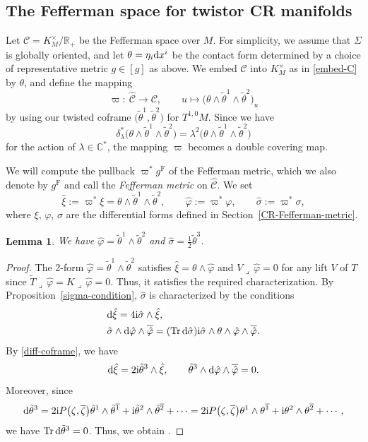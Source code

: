 \documentclass[pdftex]{sigma}
\renewcommand\a{\alpha}
\renewcommand\b{\beta}
\renewcommand\d{\delta}
\renewcommand\th{\theta}
\newcommand\ol{\overline}
\newcommand{\wh}{\widehat}
\numberwithin{equation}{section}
\newtheorem{Lemma}[Theorem]{Lemma}
\begin{document}
\subsection{The Fefferman space for twistor CR manifolds}
Let $\mathcal{C}=K_M^\times/\mathbb{R}_+$ be the Fefferman space over $M$. For simplicity, we assume that $\Sigma$ is globally oriented, and let $\th=\eta_i{\rm d}x^i$ be the contact form determined by a choice of representative metric $g\in[g]$ as above.
We embed $\mathcal{C}$ into $K^\times_M$ as in \eqref{embed-C} by $\th$, and define the mapping
\[
\varpi\colon \ \wh{\mathcal{C}}\longrightarrow \mathcal{C}, \qquad u\longmapsto \bigl(\theta\wedge\tilde\theta^1\wedge\tilde\theta^2\bigr)_u
\]
by using our twisted coframe $\bigl(\tilde\th^1, \tilde\th^2\bigr)$ for $T^{1, 0}M$. %
Since we have
\[
\d_\lambda^*\bigl(\theta\wedge\tilde\theta^1\wedge\tilde\theta^2\bigr)
=\lambda^2\bigl(\theta\wedge\tilde\theta^1\wedge\tilde\theta^2\bigr)
\]
for the action of $\lambda\in\mathbb{C}^*$, the mapping $\varpi$ becomes a double covering map.

We will compute the pullback $\varpi^*g^{\mathrm{F}}$ of the Fefferman metric, which we also denote by $g^{\mathrm{F}}$ and call the {\it Fefferman metric} on $\wh{\mathcal{C}}$. We set
\[
\hat{\xi}:=\varpi^*\xi=\theta\wedge\tilde\theta^1\wedge\tilde\theta^2,\qquad \hat{\varphi}:=\varpi^*\varphi, \qquad \hat{\sigma}:=\varpi^*\sigma,
\]
where $\xi$, $\varphi$, $\sigma$ are the differential forms defined in Section~\ref{CR-Fefferman-metric}.
\begin{Lemma}
We have $\hat\varphi=\tilde\theta^1\wedge\tilde\theta^2$ and $\hat\sigma=\frac{1}{2}\tilde\th^3$.
\end{Lemma}
\begin{proof}
The 2-form $\hat\varphi=\tilde\theta^1\wedge\tilde\theta^2$ satisfies
$\hat\xi=\th\wedge\hat\varphi$ and $V\lrcorner\,\hat\varphi=0$ for any lift $V$ of $T$ since $\tilde T\lrcorner\,\hat\varphi= K\lrcorner\,\hat\varphi=0$. Thus, it satisfies the required characterization. By Proposition~\ref{sigma-condition}, $\hat\sigma$ is characterized by the conditions
\begin{align*}
&{\rm d}\hat\xi=4{\rm i}\hat\sigma\wedge\hat\xi, \\
&\hat\sigma\wedge {\rm d}\hat\varphi\wedge\ol{\hat\varphi}=(\operatorname{Tr} {\rm d}\hat\sigma){\rm i}\hat\sigma\wedge\th\wedge\hat\varphi\wedge\ol{\hat\varphi}.
\end{align*}
By \eqref{diff-coframe}, we have
\[
{\rm d}\hat\xi=2{\rm i}\tilde\theta^3\wedge\hat\xi, \qquad
\tilde\theta^3\wedge {\rm d}\hat\varphi\wedge \ol{\hat\varphi}=0.
\]
Moreover, since
\begin{align*}
{\rm d}\tilde\theta^3 =2{\rm i}P\bigl(\zeta, \ol\zeta\bigr)\tilde\theta^1\wedge\tilde\theta^{\ol1}+{\rm i}\tilde\theta^2\wedge\tilde\theta^{\ol2}+\cdots
 =2{\rm i}P\bigl(\zeta, \ol\zeta\bigr)\theta^1\wedge\theta^{\ol1}+{\rm i}\theta^2\wedge\theta^{\ol2}+\cdots,
\end{align*}
we have $\operatorname{Tr}{\rm d}\tilde\theta^3=0$. Thus, we obtain .
\end{proof}
\end{document}
